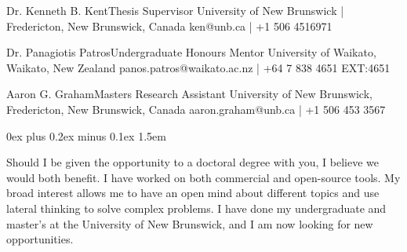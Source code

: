 \documentclass[9.5pt]{developercv} %
\begin{document}
\clearpage


\begin{entrylist}

    \entry%
        {Dr. Kenneth B. Kent}{Thesis Supervisor}
        {University of New Brunswick | Fredericton, New Brunswick, Canada}
        {ken@unb.ca | +1 506 4516971}

    \entry%
        {Dr. Panagiotis Patros}{Undergraduate Honours Mentor}
        {University of Waikato, Waikato, New Zealand}
        {panos.patros@waikato.ac.nz | +64 7 838 4651 EXT:4651}

    \entry%
        {Aaron G. Graham}{Masters Research Assistant}
        {University of New Brunswick, Fredericton, New Brunswick, Canada}
        {aaron.graham@unb.ca | +1 506 453 3567}

\end{entrylist}

\nocite{*}

\printbibliography[heading=pip, keyword=inprogresspapers]

\printbibliography[heading=pubp, keyword=publishedpapers]

\printbibliography[heading=diss, keyword=dissertations]

\printbibliography[heading=talks, keyword=talks]

\printbibliography[heading=poster, keyword=poster]

\clearpage



\large
\justifying
\parskip 0ex plus 0.2ex minus 0.1ex
\parindent1.5em
\fontsize{12}{24}\selectfont

Should I be given the opportunity to a doctoral degree with you, I believe we would both benefit.
I have worked on both commercial and open-source tools.
My broad interest allows me to have an open mind about different topics and use lateral thinking to solve complex problems.
I have done my undergraduate and master's at the University of New Brunswick, and I am now looking for new opportunities.
\end{document}
